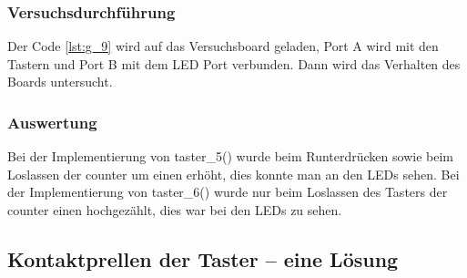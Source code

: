 \documentclass[12pt,a4paper]{article}
\begin{document}
\subsubsection*{Versuchsdurchführung}

Der Code \ref{lst:g_9} wird auf das Versuchsboard geladen, Port A wird mit den Tastern und Port B mit dem LED Port verbunden. Dann wird das Verhalten des Boards untersucht.

\subsubsection*{Auswertung}

Bei der Implementierung von taster\_5() wurde beim Runterdrücken sowie beim Loslassen der counter um einen erhöht, dies konnte man an den LEDs sehen.
Bei der Implementierung von taster\_6() wurde nur beim Loslassen des Tasters der counter einen hochgezählt, dies war bei den LEDs zu sehen.

\subsection{Kontaktprellen der Taster -- eine Lösung}
\end{document}
